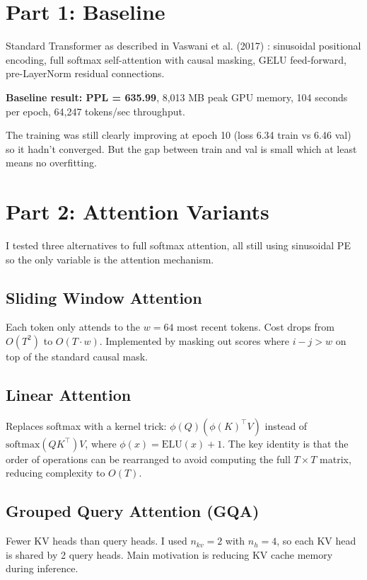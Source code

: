 \documentclass[12pt,a4paper]{article}
\begin{document}
\section{Part 1: Baseline}

Standard Transformer as described in Vaswani et al. (2017) \cite{vaswani2017attention}: sinusoidal positional encoding, full softmax self-attention with causal masking, GELU feed-forward, pre-LayerNorm residual connections.

\textbf{Baseline result: PPL = 635.99}, 8,013 MB peak GPU memory, 104 seconds per epoch, 64,247 tokens/sec throughput.

The training was still clearly improving at epoch 10 (loss 6.34 train vs 6.46 val) so it hadn't converged. But the gap between train and val is small which at least means no overfitting.

\section{Part 2: Attention Variants}

I tested three alternatives to full softmax attention, all still using sinusoidal PE so the only variable is the attention mechanism.

\subsection{Sliding Window Attention}

Each token only attends to the $w=64$ most recent tokens. Cost drops from $O(T^2)$ to $O(T \cdot w)$. Implemented by masking out scores where $i - j > w$ on top of the standard causal mask.

\subsection{Linear Attention}

Replaces softmax with a kernel trick: $\phi(Q)(\phi(K)^\top V)$ instead of $\text{softmax}(QK^\top)V$, where $\phi(x) = \text{ELU}(x) + 1$. The key identity is that the order of operations can be rearranged to avoid computing the full $T \times T$ matrix, reducing complexity to $O(T)$.

\subsection{Grouped Query Attention (GQA)}

Fewer KV heads than query heads. I used $n_{kv}=2$ with $n_h=4$, so each KV head is shared by 2 query heads. Main motivation is reducing KV cache memory during inference.
\end{document}
